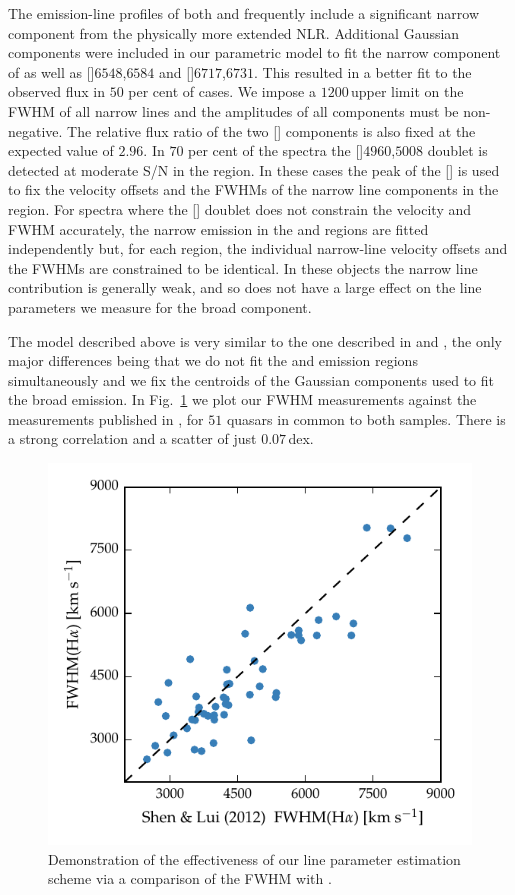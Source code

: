 The emission-line profiles of both \hb and \ha frequently include a significant narrow component from the physically more extended NLR. 
Additional Gaussian components were included in our parametric model to fit the narrow component of \ha as well as []\ll$6548$,$6584$ and []\ll$6717$,$6731$.
This resulted in a better fit to the observed flux in $50$ per cent of cases. 
We impose a $1200$\,\kms upper limit on the FWHM of all narrow lines and the amplitudes of all components must be non-negative.
The relative flux ratio of the two [] components is also fixed at the expected value of $2.96$.
In $70$ per cent of the spectra the []\ll$4960$,$5008$ doublet is detected at moderate S/N in the \hb region. 
In these cases the peak of the [] is used to fix the velocity offsets and the FWHMs of the narrow line components in the \ha region.  
For spectra where the [] doublet does not constrain the velocity and FWHM accurately, the narrow emission in the \ha and \hb regions are fitted independently but, for each region, the individual narrow-line velocity offsets and the FWHMs are constrained to be identical. 
In these objects the narrow line contribution is generally weak, and so does not have a large effect on the line parameters we measure for the broad component.   

The model described above is very similar to the one described in \citet{shen12} and \citet{shen11}, the only major differences being that we do not fit the \ha and \hb emission regions simultaneously and we fix the centroids of the Gaussian components used to fit the broad emission.
In Fig.~\ref{fig:shen_comparison_ha} we plot our \ha FWHM measurements against the measurements published in \citet{shen12}, for $51$ quasars in common to both samples.
There is a strong correlation and a scatter of just $0.07$\,dex. 

\begin{figure}
    \centering 
    \includegraphics[width=0.8\linewidth]{figures/chapter03/shen_comparison_ha.pdf} 
    \caption{Demonstration of the effectiveness of our line parameter estimation scheme via a comparison of the \ha FWHM with \citet{shen12}.} 
    \label{fig:shen_comparison_ha}
\end{figure}

